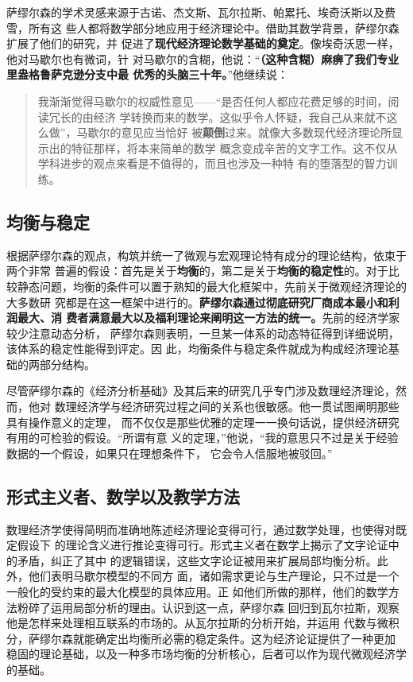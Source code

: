 萨缪尔森的学术灵感来源于古诺、杰文斯、瓦尔拉斯、帕累托、埃奇沃斯以及费雪，所有这
些人都将数学部分地应用于经济理论中。借助其数学背景，萨缪尔森扩展了他们的研究，并
促进了\textbf{现代经济理论数学基础的奠定}。像埃奇沃思一样，他对马歇尔也有微词，针
对马歇尔的含糊，他说：“\textbf{（这种含糊）麻痹了我们专业里盎格鲁萨克逊分支中最
  优秀的头脑三十年。}”他继续说：
\begin{quotation}
  我渐渐觉得马歇尔的权威性意见——“是否任何人都应花费足够的时间，阅读冗长的由经济
  学转换而来的数学。这似乎令人怀疑，我自己从来就不这么做”，马歇尔的意见应当恰好
  被\textbf{颠倒}过来。就像大多数现代经济理论所显示出的特征那样，将本来简单的数学
  概念变成辛苦的文字工作。这不仅从学科进步的观点来看是不值得的，而且也涉及一种特
  有的堕落型的智力训练。
\end{quotation}

\subsection{均衡与稳定}

根据萨缪尔森的观点，构筑并统一了微观与宏观理论特有成分的理论结构，依束于两个非常
普遍的假设：首先是关于\textbf{均衡}的，第二是关于\textbf{均衡的稳定性}的。对于比
较静态问题，均衡的条件可以置于熟知的最大化框架中，先前关于微观经济理论的大多数研
究都是在这一框架中进行的。\textbf{萨缪尔森通过彻底研究厂商成本最小和利润最大、消
  费者满意最大以及福利理论来阐明这一方法的统一。}先前的经济学家较少注意动态分析，
萨缪尔森则表明，一旦某一体系的动态特征得到详细说明，该体系的稳定性能得到评定。因
此，均衡条件与稳定条件就成为构成经济理论基础的两部分结构。

尽管萨缪尔森的《经济分析基础》及其后来的研究几乎专门涉及数理经济理论，然而，他对
数理经济学与经济研究过程之间的关系也很敏感。他一贯试图阐明那些具有操作意义的定理，
而不仅仅是那些优雅的定理一一换句话说，提供经济研究有用的可检验的假设。“所谓有意
义的定理，”他说，“我的意思只不过是关于经验数据的一个假设，如果只在理想条件下，
它会令人信服地被驳回。”

\subsection{形式主义者、数学以及教学方法}

数理经济学使得简明而准确地陈述经济理论变得可行，通过数学处理，也使得对既定假设下
的理论含义进行推论变得可行。形式主义者在数学上揭示了文字论证中的矛盾，纠正了其中
的逻辑错误，这些文字论证被用来扩展局部均衡分析。此外，他们表明马歇尔模型的不同方
面，诸如需求更论与生产理论，只不过是一个一般化的受约束的最大化模型的具体应用。正
如他们所做的那样，他们的数学方法粉碎了运用局部分析的理由。认识到这一点，萨缪尔森
回归到瓦尔拉斯，观察他是怎样来处理相互联系的市场的。从瓦尔拉斯的分析开始，并运用
代数与微积分，萨缪尔森就能确定出均衡所必需的稳定条件。这为经济论证提供了一种更加
稳固的理论基础，以及一种多市场均衡的分析核心，后者可以作为现代微观经济学的基础。

